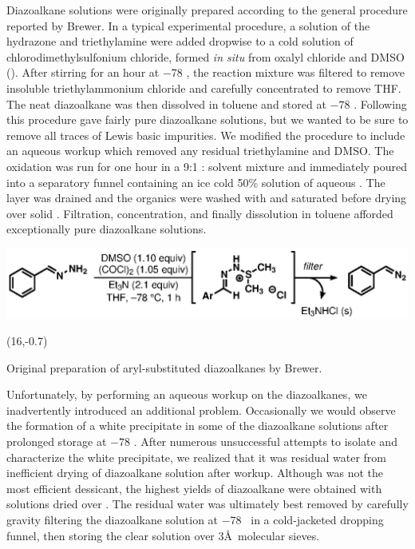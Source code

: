 Diazoalkane solutions were originally prepared according to the general procedure reported by Brewer. In a typical experimental procedure, a
solution of the hydrazone and triethylamine were added dropwise to a cold solution of chlorodimethylsulfonium chloride, formed \textit{in situ} from oxalyl chloride and DMSO ().
After stirring for an hour at $-$78 \degc, the reaction mixture was filtered to remove insoluble
triethylammonium chloride and carefully concentrated to remove THF. The neat diazoalkane was then
dissolved in toluene and stored at $-78$ \degc. Following this procedure gave fairly pure
diazoalkane solutions, but we wanted to be sure to remove all traces of Lewis basic impurities. We modified the procedure to include an aqueous workup which
removed any residual triethylamine and DMSO. The oxidation was run for one hour
in a 9:1 : solvent mixture and immediately poured into a separatory funnel
containing an ice cold 50\% solution of aqueous . The  layer was drained and the
organics were washed with  and saturated  before drying over solid . Filtration,
concentration, and finally dissolution in toluene afforded exceptionally pure diazoalkane solutions. 
\begin{Scheme}[h]
  \centering
  \includegraphics[scale=0.8]{chp_asymmetric/images/brewerswern}
  \begin{textblock}{1}(16,-0.7)  \end{textblock}
  \caption{Original preparation of aryl-substituted diazoalkanes by Brewer.}
  \label{sch:asbrewerswern}
\end{Scheme}  

Unfortunately, by performing an aqueous workup on the diazoalkanes, we inadvertently introduced an
additional problem. Occasionally we would observe the formation of a white precipitate in some of
the diazoalkane solutions after prolonged storage at $-78$ \degc. After numerous unsuccessful
attempts to isolate and characterize the white precipitate, we realized that it was residual water
from inefficient drying of diazoalkane solution after workup. Although  was not the most
efficient dessicant, the highest yields of diazoalkane were obtained with solutions dried over
. The residual water was ultimately best removed by carefully gravity filtering the
diazoalkane solution at $-$78 \degc\ in a cold-jacketed dropping funnel, then storing the clear
solution over 3\AA\ molecular sieves.

